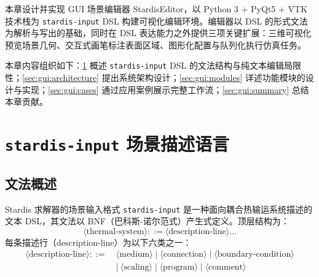 本章设计并实现 GUI 场景编辑器 StardisEditor，以 Python 3 + PyQt5 + VTK 技术栈为 \texttt{stardis-input} DSL 构建可视化编辑环境。编辑器以 DSL 的形式文法为解析与写出的基础，同时在 DSL 表达能力之外提供三项关键扩展：三维可视化预览场景几何、交互式画笔标注表面区域、图形化配置与队列化执行仿真任务。

本章内容组织如下：\ref{sec:gui:dsl} 概述 \texttt{stardis-input} DSL 的文法结构与纯文本编辑局限性；\ref{sec:gui:architecture} 提出系统架构设计；\ref{sec:gui:modules} 详述功能模块的设计与实现；\ref{sec:gui:cases} 通过应用案例展示完整工作流；\ref{sec:gui:summary} 总结本章贡献。


\section{\texttt{stardis-input} 场景描述语言}
\label{sec:gui:dsl}

\subsection{文法概述}

Stardis 求解器的场景输入格式 \texttt{stardis-input}\cite{mesostarStardisinputThermalSystem2024} 是一种面向耦合热输运系统描述的文本 DSL，其文法以 BNF（巴科斯-诺尔范式）产生式定义。顶层结构为：
%
\begin{equation}
\langle\text{thermal-system}\rangle ::= \langle\text{description-line}\rangle\ldots
\label{eq:gui:bnf-top}
\end{equation}
%
每条描述行（description-line）为以下六类之一：
%
\begin{equation}
\begin{aligned}
\langle\text{description-line}\rangle ::=\ &\langle\text{medium}\rangle \mid
  \langle\text{connection}\rangle \mid
  \langle\text{boundary-condition}\rangle \\
  &\mid\ \langle\text{scaling}\rangle \mid
  \langle\text{program}\rangle \mid
  \langle\text{comment}\rangle
\end{aligned}
\label{eq:gui:bnf-line}
\end{equation}
%

